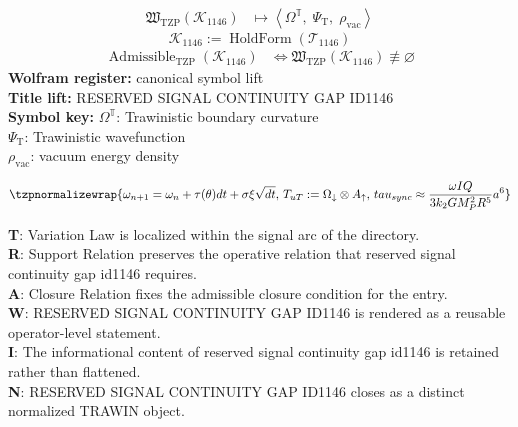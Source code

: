 \noindent
\begin{minipage}[t]{0.48\linewidth}
\begingroup
\small
\[
\begin{aligned}
\mathfrak{W}_{\mathrm{TZP}}\!\left(\mathcal{K}_{1146}\right)
&\longmapsto
\left\langle \Omega^{\mathbb{T}},\; \Psi_{\mathrm{T}},\; \rho_{\mathrm{vac}} \right\rangle
\end{aligned}
\]
\[
\mathcal{K}_{1146}
:=
\operatorname{HoldForm}\!\left(\mathcal{T}_{1146}\right)
\]
\[
\begin{aligned}
\operatorname{Admissible}_{\mathrm{TZP}}\!\left(\mathcal{K}_{1146}\right)
&\Longleftrightarrow
\mathfrak{W}_{\mathrm{TZP}}\!\left(\mathcal{K}_{1146}\right)\not\equiv\varnothing
\end{aligned}
\]
\textbf{Wolfram register:} canonical symbol lift\\
\textbf{Title lift:} RESERVED SIGNAL CONTINUITY GAP ID1146\\
\textbf{Symbol key:} \(\Omega^{\mathbb{T}}\): Trawinistic boundary curvature\\ \(\Psi_{\mathrm{T}}\): Trawinistic wavefunction\\ \(\rho_{\mathrm{vac}}\): vacuum energy density
\par
\endgroup
\end{minipage}\hfill
\begin{minipage}[t]{0.48\linewidth}
\[
\tzpnormalizewrap{\omega_{n+1} = \omega_n + \tau(\theta)dt + \sigma \xi \sqrt{dt},\,T_{uT} := \Omega_{\downarrow} \otimes A_{\uparrow},\,tau_{sync} \approx \frac{\omega I Q}{3 k_2 G M_P^2 R^5} a^6}
\]

\small
\textbf{T}: Variation Law is localized within the signal arc of the directory.\\
\textbf{R}: Support Relation preserves the operative relation that reserved signal continuity gap id1146 requires.\\
\textbf{A}: Closure Relation fixes the admissible closure condition for the entry.\\
\textbf{W}: RESERVED SIGNAL CONTINUITY GAP ID1146 is rendered as a reusable operator-level statement.\\
\textbf{I}: The informational content of reserved signal continuity gap id1146 is retained rather than flattened.\\
\textbf{N}: RESERVED SIGNAL CONTINUITY GAP ID1146 closes as a distinct normalized TRAWIN object.
\normalsize
\end{minipage}

